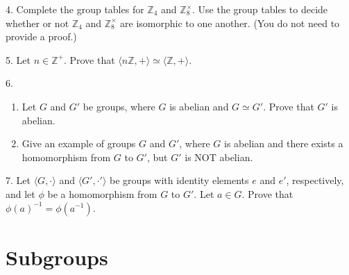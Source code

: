 \documentclass[10pt,openany,oneside]{book}
\theoremstyle{plain}
\theoremstyle{definition}
\theoremstyle{definition}
\theoremstyle{definition}
\theoremstyle{definition}
\numberwithin{equation}{section}
\def\Z{\mathbb{Z}}
\begin{document}
\begin{exerciselist}
\begin{enumerate}[label=(\alph*)]
\end{enumerate}
%
\par\smallskip
\item[4.]\hypertarget{exercise-24}{}Complete the group tables for \(\Z_4\) and \(\Z_8^{\times}\). Use the group tables to decide whether or not \(\Z_4\) and \(\Z_8^{\times}\) are isomorphic to one another. (You do not need to provide a proof.)%
\par\smallskip
\item[5.]\hypertarget{exercise-25}{}Let \(n\in \Z^+\). Prove that \(\langle n\Z,+\rangle  \simeq \langle \Z,+\rangle\).%
\par\smallskip
\item[6.]\hypertarget{exercise-26}{}\leavevmode%
\begin{enumerate}[label=(\alph*)]
\item\hypertarget{li-186}{}Let \(G\) and \(G'\) be groups, where \(G\) is abelian and  \(G\simeq G'\). Prove that \(G'\) is abelian.%
\item\hypertarget{li-187}{}Give an example of groups \(G\) and \(G'\), where \(G\) is abelian and there exists a homomorphism from \(G\) to \(G'\), but \(G'\) is NOT abelian.%
\end{enumerate}
%
\par\smallskip
\item[7.]\hypertarget{exercise-27}{}Let \(\langle G,\cdot\rangle\) and \(\langle G',\cdot'\rangle\) be groups with identity elements \(e\) and \(e'\), respectively, and let \(\phi\) be a homomorphism from \(G\) to \(G'\). Let \(a\in G\). Prove that \(\phi(a)^{-1}=\phi(a^{-1})\).%
\par\smallskip
\end{exerciselist}
\typeout{************************************************}
\typeout{************************************************}
\chapter[{Subgroups}]{Subgroups}\label{subgps}
\typeout{************************************************}
\typeout{************************************************}
\end{document}
